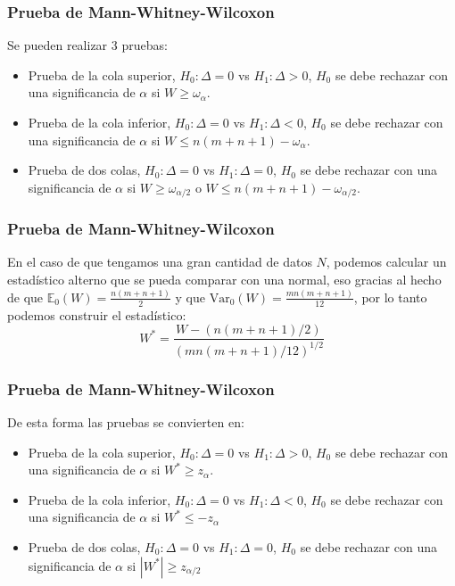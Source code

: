 \documentclass[aspectratio=169,spanish]{beamer}
\begin{document}
\begin{frame}
\frametitle{Prueba de Mann-Whitney-Wilcoxon}
Se pueden realizar 3 pruebas:
\begin{itemize}
\item Prueba de la cola superior, $H_0:\Delta=0$ vs $H_1:\Delta>0$, $H_0$ se debe rechazar con una significancia de $\alpha$ si $W\ge\omega_\alpha$.
\item Prueba de la cola inferior, $H_0:\Delta=0$ vs $H_1:\Delta<0$, $H_0$ se debe rechazar con una significancia de $\alpha$ si $W\le n(m+n+1)-\omega_\alpha$.
\item Prueba de dos colas, $H_0:\Delta=0$ vs $H_1:\Delta=0$, $H_0$ se debe rechazar con una significancia de $\alpha$ si $W\ge\omega_{\alpha/2}$ o $W\le n(m+n+1)-\omega_{\alpha/2}$.
\end{itemize}
\end{frame}


\begin{frame}
\frametitle{Prueba de Mann-Whitney-Wilcoxon}
En el caso de que tengamos una gran cantidad de datos $N$, podemos calcular un estadístico alterno que se pueda comparar con una normal, eso gracias al hecho de que $\mathbb{E}_0(W)=\frac{n(m+n+1)}{2}$ y que $\text{Var}_0(W)=\frac{mn(m+n+1)}{12}$, por lo tanto podemos construir el estadístico:
$$W^{*}=\frac{W-(n(m+n+1)/2)}{(mn(m+n+1)/12)^{1/2}}$$
\end{frame}
\begin{frame}
\frametitle{Prueba de Mann-Whitney-Wilcoxon}
De esta forma las pruebas se convierten en:
\begin{itemize}
\item Prueba de la cola superior, $H_0:\Delta=0$ vs $H_1:\Delta>0$, $H_0$ se debe rechazar con una significancia de $\alpha$ si $W^{*}\ge z_\alpha$.
\item Prueba de la cola inferior, $H_0:\Delta=0$ vs $H_1:\Delta<0$, $H_0$ se debe rechazar con una significancia de $\alpha$ si $W^{*}\le -z_\alpha$
\item Prueba de dos colas, $H_0:\Delta=0$ vs $H_1:\Delta=0$, $H_0$ se debe rechazar con una significancia de $\alpha$ si $|W^{*}|\ge z_{\alpha/2}$
\end{itemize}
\end{frame}
\end{document}
